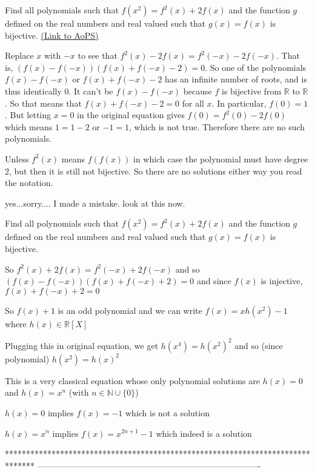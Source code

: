 \begin{problem}
	Find all polynomials such that $ f(x^{2})=f^{2}(x)+2f(x) $ and the function $ g $ defined on the real numbers and real valued such that $ g(x)=f(x) $ is bijective.
	\flushright \href{https://artofproblemsolving.com/community/c6h469554}{(Link to AoPS)}
\end{problem}



\begin{solution}
	Replace $x$ with $-x$ to see that $f^2(x)-2f(x)=f^2(-x)-2f(-x)$.  That is, $(f(x)-f(-x))(f(x)+f(-x)-2)=0$.  So one of the polynomials $f(x)-f(-x)$ or $f(x)+f(-x)-2$ has an infinite number of roots, and is thus identically 0.  It can't be $f(x)-f(-x)$ because $f$ is bijective from $\mathbb{R}$ to $\mathbb{R}$.  So that means that $f(x)+f(-x)-2=0$ for all $x$.  In particular, $f(0)=1$.  But letting $x=0$ in the original equation gives $f(0)=f^2(0)-2f(0)$ which means $1=1-2$ or $-1=1$, which is not true.  Therefore there are no such polynomials.

Unless $f^2(x)$ means $f(f(x))$ in which case the polynomial must have degree 2, but then it is still not bijective.  So there are no solutions either way you read the notation.
\end{solution}



\begin{solution}
	yes...sorry.... I made a mistake. look at this now.
\end{solution}



\begin{solution}
	\begin{tcolorbox}Find all polynomials such that $ f(x^{2})=f^{2}(x)+2f(x) $ and the function $ g $ defined on the real numbers and real valued such that $ g(x)=f(x) $ is bijective.\end{tcolorbox}
So $f^2(x)+2f(x)=f^2(-x)+2f(-x)$ and so $(f(x)-f(-x))(f(x)+f(-x)+2)=0$ and since $f(x)$ is injective, $f(x)+f(-x)+2=0$

So $f(x)+1$ is an odd polynomial and we can write $f(x)=xh(x^2)-1$ where $h(x)\in\mathbb R[X]$

Plugging this in original equation, we get $h(x^4)=h(x^2)^2$ and so (since polynomial) $h(x^2)=h(x)^2$

This is a very classical equation whose only polynomial solutions are $h(x)=0$ and $h(x)=x^n$ (with $n\in\mathbb N\cup\{0\}$)

$h(x)=0$ implies $f(x)=-1$ which is not a solution

$h(x)=x^n$ implies $\boxed{f(x)=x^{2n+1}-1}$ which indeed is a solution
\end{solution}
*******************************************************************************
-------------------------------------------------------------------------------

